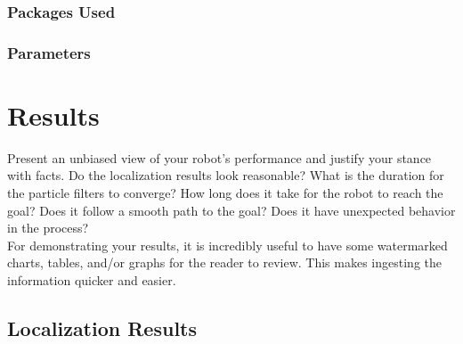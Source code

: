\documentclass[10pt,journal,compsoc]{IEEEtran}
\begin{document}
\subsubsection{Packages Used}
\subsubsection{Parameters}


\section{Results}

Present an unbiased view of your robot's performance and justify your stance with facts. Do the localization results look reasonable? What is the duration for the particle filters to converge? How long does it take for the robot to reach the goal? Does it follow a smooth path to the goal? Does it have unexpected behavior in the process? \\
For demonstrating your results, it is incredibly useful to have some watermarked charts, tables, and/or graphs for the reader to review. This makes ingesting the information quicker and easier.

\subsection{Localization Results}
\end{document}
